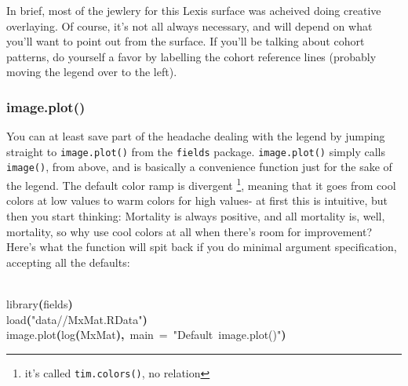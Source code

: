\documentclass[a4paper]{article}
\newcommand{\hlfunctioncall}[1]{\textcolor[rgb]{1,0,0}{#1}}%
\newcommand{\hlstring}[1]{\textcolor[rgb]{0.6,0.6,1}{#1}}%
\newcommand{\hlkeyword}[1]{\textcolor[rgb]{0,0,0}{\textbf{#1}}}%
\newcommand{\hlargument}[1]{\textcolor[rgb]{0.694117647058824,0.247058823529412,0.0196078431372549}{#1}}%
\newcommand{\hlsymbol}[1]{\textcolor[rgb]{0,0,0}{#1}}%
\newcommand{\hlprompt}[1]{\textcolor[rgb]{0,0,0}{#1}}%
\newcommand{\hlstd}[1]{\textcolor[rgb]{0,0,0}{#1}}%
\newenvironment{Houtput}{\raggedright}{%
%
}
\begin{document}
In brief, most of the jewlery for this Lexis surface was acheived doing creative overlaying. Of course, it's not all always necessary, and will depend on what you'll want to point out from the surface. If you'll be talking about cohort patterns, do yourself a favor by labelling the cohort reference lines (probably moving the legend over to the left). 
\subsubsection{image.plot()}

You can at least save part of the headache dealing with the legend by jumping straight to \texttt{image.plot()} from the \texttt{fields} package. \texttt{image.plot()} simply calls \texttt{image()}, from above, and is basically a convenience function just for the sake of the legend. The default color ramp is divergent \footnote{it's called \texttt{tim.colors()}, no relation}, meaning that it goes from cool colors at low values to warm colors for high values- at first this is intuitive, but then you start thinking: Mortality is always positive, and all mortality is, well, mortality, so why use cool colors at all when there's room for improvement? Here's what the function will spit back if you do minimal argument specification, accepting all the defaults:

\begin{Houtput}
\hspace*{\fill}\\
\hlstd{}\ttfamily\noindent
\hlprompt{\usebox{\hlnormalsizeboxgreaterthan}{\ }}\hlfunctioncall{library}\hlkeyword{(}\hlsymbol{fields}\hlkeyword{)}\mbox{}
\normalfont
\hspace*{\fill}\\
\hlstd{}\ttfamily\noindent
\hlprompt{\usebox{\hlnormalsizeboxgreaterthan}{\ }}\hlfunctioncall{load}\hlkeyword{(}\hlstring{"data//MxMat.RData"}\hlkeyword{)}\mbox{}
\normalfont
\hspace*{\fill}\\
\hlstd{}\ttfamily\noindent
\hlprompt{\usebox{\hlnormalsizeboxgreaterthan}{\ }}\hlfunctioncall{image.plot}\hlkeyword{(}\hlfunctioncall{log}\hlkeyword{(}\hlsymbol{MxMat}\hlkeyword{)}\hlkeyword{,}{\ }\hlargument{main}{\ }\hlargument{=}{\ }\hlstring{"Default{\ }image.plot()"}\hlkeyword{)}\mbox{}
\normalfont
\hspace*{\fill}\\
\hlstd{}
\end{Houtput}
\end{document}
